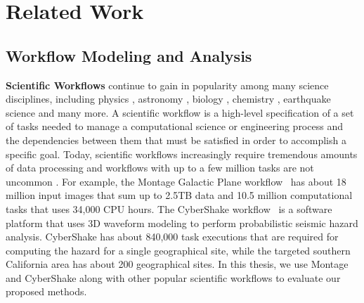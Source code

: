 \chapter{Related Work}
\label{chap:related}






\section{Workflow Modeling and Analysis}

\textbf{Scientific Workflows} continue to gain in popularity among many science disciplines, including physics \cite{Deelman2002}, astronomy \cite{Sakellariou2010}, biology \cite{Lathers2006, Oinn2004}, chemistry \cite{Wieczorek2005}, earthquake science \cite{Maechling2007} and many more. A scientific workflow is a high-level specification of a set of tasks needed to manage a computational science or engineering process and the dependencies between them that must be satisfied in order to accomplish a specific goal. Today, scientific workflows increasingly require tremendous amounts of data processing and workflows with up to a few million tasks are not uncommon \cite{Callaghan2011}. For example, the Montage Galactic Plane workflow~\cite{Berriman2004} has about 18 million input images that sum up to 2.5TB data and 10.5 million computational tasks that uses 34,000 CPU hours. The CyberShake workflow~\cite{Callaghan2008} is a software platform that uses 3D waveform modeling to perform probabilistic seismic hazard analysis. CyberShake has about 840,000 task executions that are required for computing the hazard for a single geographical site, while the targeted southern California area has about 200 geographical sites. In this thesis, we use Montage and CyberShake along with other popular scientific workflows to evaluate our proposed methods. 

